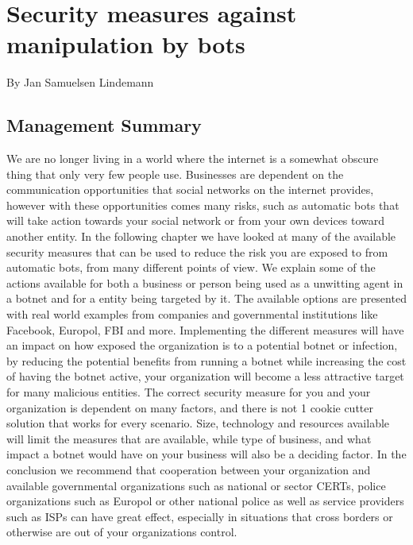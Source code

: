 \chapter{Security measures against manipulation by bots}
\small{By Jan Samuelsen Lindemann}
\section*{Management Summary}
We are no longer living in a world where the internet is a somewhat obscure thing that only very few people use. Businesses are dependent on the communication opportunities that social networks on the internet provides, however with these opportunities comes many risks, such as automatic bots that will take action towards your social network or from your own devices toward another entity.
In the following chapter we have looked at many of the available security measures that can be used to reduce the risk you are exposed to from automatic bots, from many different points of view.
We explain some of the actions available for both a business or person being used as a unwitting agent in a botnet and for a entity being targeted by it.
The available options are presented with real world examples from companies and governmental institutions like Facebook, Europol, FBI and more.
Implementing the different measures will have an impact on how exposed the organization is to a potential botnet or infection, by reducing the potential benefits from running a botnet while increasing the cost of having the botnet active, your organization will become a less attractive target for many malicious entities.
The correct security measure for you and your organization is dependent on many factors, and there is not 1 cookie cutter solution that works for every scenario.
Size, technology and resources available will limit the measures that are available, while type of business, and what impact a botnet would have on your business will also be a deciding factor.
In the conclusion we recommend that cooperation between your organization and available governmental organizations such as national or sector CERTs, police organizations such as Europol or other national police as well as service providers such as ISPs can have great effect, especially in situations that cross borders or otherwise are out of your organizations control.
\newpage
{}
